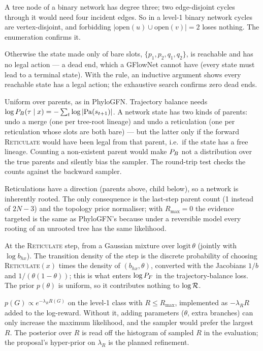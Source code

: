 A tree node of a binary network has degree three; two edge-disjoint cycles through it would need four incident edges. So in a level-1 binary network cycles are vertex-disjoint, and forbidding $|\mathrm{open}(u)\cup\mathrm{open}(v)|=2$ loses nothing. The enumeration confirms it.

Otherwise the state made only of bare slots, $\{p_1,p_2,q_1,q_2\}$, is reachable and has no legal action --- a dead end, which a GFlowNet cannot have (every state must lead to a terminal state). With the rule, an inductive argument shows every reachable state has a legal action; the exhaustive search confirms zero dead ends.

Uniform over parents, as in PhyloGFN. Trajectory balance needs $\log P_B(\tau\mid x)=-\sum_t\log|\mathrm{Pa}(s_{t+1})|$. A network state has two kinds of parents: undo a merge (one per tree-root lineage) and undo a reticulation (one per reticulation whose slots are both bare) --- but the latter only if the forward \textsc{Reticulate} would have been legal from that parent, i.e.\ if the state has a free lineage. Counting a non-existent parent would make $P_B$ not a distribution over the true parents and silently bias the sampler. The round-trip test checks the counts against the backward sampler.

Reticulations have a direction (parents above, child below), so a network is inherently rooted. The only consequence is the last-step parent count (1 instead of $2N-3$) and the topology prior normaliser; with $R_{\max}=0$ the evidence targeted is the same as PhyloGFN's because under a reversible model every rooting of an unrooted tree has the same likelihood.

At the \textsc{Reticulate} step, from a Gaussian mixture over $\mathrm{logit}\,\theta$ (jointly with $\log b_{hx}$). The transition density of the step is the discrete probability of choosing \textsc{Reticulate}$(x)$ times the density of $(b_{hx},\theta)$, converted with the Jacobians $1/b$ and $1/(\theta(1-\theta))$; this is what enters $\log P_F$ in the trajectory-balance loss. The prior $p(\theta)$ is uniform, so it contributes nothing to $\log\mathcal{R}$.

$p(G)\propto e^{-\lambda_RR(G)}$ on the level-1 class with $R\le R_{\max}$, implemented as $-\lambda_RR$ added to the log-reward. Without it, adding parameters ($\theta$, extra branches) can only increase the maximum likelihood, and the sampler would prefer the largest $R$. The posterior over $R$ is read off the histogram of sampled $R$ in the evaluation; the proposal's hyper-prior on $\lambda_R$ is the planned refinement.

